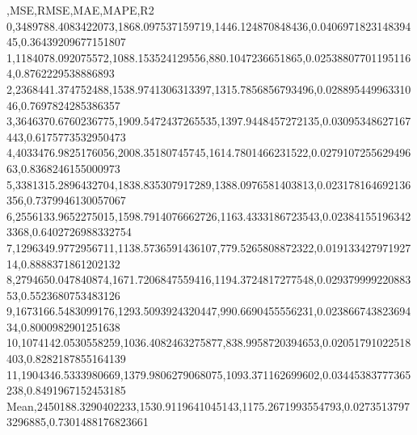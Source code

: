 ,MSE,RMSE,MAE,MAPE,R2
0,3489788.4083422073,1868.097537159719,1446.124870848436,0.040697182314839445,0.36439209677151807
1,1184078.092075572,1088.153524129556,880.1047236651865,0.025388077011951164,0.8762229538886893
2,2368441.374752488,1538.9741306313397,1315.7856856793496,0.02889544996331046,0.7697824285386357
3,3646370.6760236775,1909.5472437265535,1397.9448457272135,0.03095348627167443,0.6175773532950473
4,4033476.9825176056,2008.35180745745,1614.7801466231522,0.027910725562949663,0.8368246155000973
5,3381315.2896432704,1838.835307917289,1388.0976581403813,0.023178164692136356,0.7379946130057067
6,2556133.9652275015,1598.7914076662726,1163.4333186723543,0.023841551963423368,0.6402726988332754
7,1296349.9772956711,1138.5736591436107,779.5265808872322,0.01913342797192714,0.8888371861202132
8,2794650.047840874,1671.7206847559416,1194.3724817277548,0.02937999922088353,0.5523680753483126
9,1673166.5483099176,1293.5093924320447,990.6690455556231,0.02386674382369434,0.8000982901251638
10,1074142.0530558259,1036.4082463275877,838.9958720394653,0.02051791022518403,0.8282187855164139
11,1904346.5333980669,1379.9806279068075,1093.371162699602,0.03445383777365238,0.8491967152453185
Mean,2450188.3290402233,1530.9119641045143,1175.2671993554793,0.02735137973296885,0.7301488176823661
